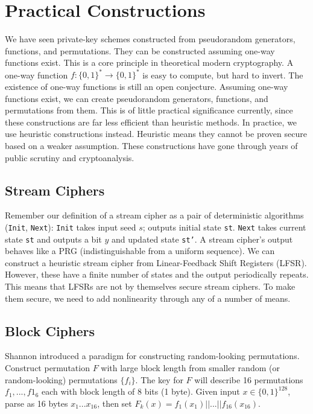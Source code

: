 \section{Practical Constructions}

We have seen private-key schemes constructed from pseudorandom generators,
functions, and permutations. They can be constructed assuming one-way functions exist.
This is a core principle in theoretical modern cryptography.
A one-way function $f : \{0, 1\}^* \rightarrow \{0, 1\}^*$ 
is easy to compute, but hard to invert.
The existence of one-way functions is still an open conjecture.
Assuming one-way functions exist, we can create pseudorandom generators,
functions, and permutations from them.
This is of little practical significance currently, since these constructions are far
less efficient than heuristic methods.
In practice, we use heuristic constructions instead.
Heuristic means they cannot be proven secure based on a weaker assumption.
These constructions have gone through years of public scrutiny and
cryptoanalysis.

\subsection{Stream Ciphers}

Remember our definition of a stream cipher as a 
pair of deterministic algorithms 
(\texttt{Init}, \texttt{Next}):
\texttt{Init} takes input seed $s$; outputs initial state \texttt{st}.
\texttt{Next} takes current state \texttt{st} and
outputs a bit $y$ and updated state \texttt{st'}.
A stream cipher's output behaves like a PRG (indistinguishable from a uniform
sequence).
We can construct a heuristic stream cipher from Linear-Feedback Shift
Registers (LFSR).
However, these have a finite number of states and the 
output periodically repeats. This means that LFSRs are not 
by themselves secure stream ciphers. 
To make them secure, we need to add nonlinearity through 
any of a number of means. 

\subsection{Block Ciphers}

Shannon introduced a paradigm for constructing random-looking permutations.
Construct permutation $F$ with large block length from smaller random (or
random-looking) permutations $\{f_i\}$.
The key for $F$ will describe 16 permutations $f_1, ... , f1_6$ each with block length of
8 bits (1 byte).
Given input $x \in \{0, 1\}^{128}$,
parse as 16 bytes $x_1 ... x_{16}$, then 
set $F_k(x) = f_1(x_1)|| . . . ||f_{16}(x_{16})$.

